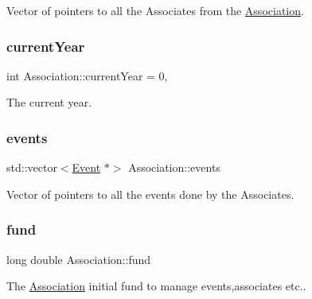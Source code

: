 Vector of pointers to all the Associates from the \hyperlink{classAssociation}{Association}. 

\mbox{\label{classAssociation_a22ed128174ec5fd440f8373fe47f42da}} 
\subsubsection{\texorpdfstring{current\+Year}{currentYear}}
{\footnotesize\ttfamily int Association\+::current\+Year = 0\hspace{0.3cm}{\ttfamily [static]}, {\ttfamily [private]}}



The current year. 

\mbox{\label{classAssociation_aaf2b66c89b34895285a108658336df51}} 
\subsubsection{\texorpdfstring{events}{events}}
{\footnotesize\ttfamily std\+::vector$<$\hyperlink{classEvent}{Event} $\ast$$>$ Association\+::events\hspace{0.3cm}{\ttfamily [private]}}



Vector of pointers to all the events done by the Associates. 

\mbox{\label{classAssociation_a891f18ca3dbbbdfa2e8fab54b1683133}} 
\subsubsection{\texorpdfstring{fund}{fund}}
{\footnotesize\ttfamily long double Association\+::fund\hspace{0.3cm}{\ttfamily [private]}}



The \hyperlink{classAssociation}{Association} initial fund to manage events,associates etc.. 

\mbox{\label{classAssociation_a165477d8d99c99a659d2f193b39ba1f8}} 
